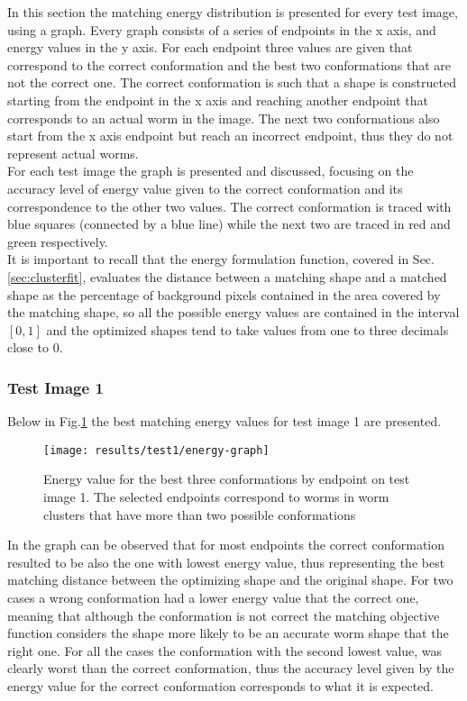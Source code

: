 In this section the matching energy distribution is presented 
for every test image, using a graph. 
Every graph consists of a series of endpoints in the
x axis, and energy values in the y axis. For each endpoint three values 
are given that correspond to the correct conformation and the best two 
conformations that are not the correct one. The correct conformation
is such that a shape is constructed starting from the endpoint in the
x axis and reaching another endpoint that corresponds to an actual
worm in the image. The next two conformations also start from the x axis
endpoint but reach an incorrect endpoint, thus they do not represent 
actual worms.\\
For each test image the graph is presented and discussed, focusing 
on the accuracy level of energy value given to the correct conformation
and its correspondence to the other two values. The correct conformation
is traced with blue squares (connected by a blue line) while the next two
are traced in red and green respectively.\\
It is important to recall that the energy formulation function, covered
in Sec.\ref{sec:clusterfit}, evaluates the distance between a matching shape
and a matched shape as the percentage of background pixels contained in the 
area covered by the matching shape, so all the possible energy values are
contained in the interval $[0,1]$ and the optimized shapes tend to take values
from one to three decimals close to $0$.

\subsubsection*{Test Image 1}

Below in Fig.\ref{fig:energy1} the best matching energy values for 
test image 1 are presented.

\begin{figure}[h]
 \centering
   \texttt{[image: results/test1/energy-graph]}
 \caption{Energy value for the best three conformations by endpoint on test
image 1. The selected endpoints correspond to worms in worm clusters that
have more than two possible conformations}
\label{fig:energy1}
\end{figure}

In the graph can be observed that for most endpoints the correct conformation
resulted to be also the one with lowest energy value, thus representing
the best matching distance between the optimizing shape and the original shape.
For two cases a wrong conformation had a lower energy value that the correct
one, meaning that 
although the conformation is not correct the matching objective function
considers the shape more likely to be an accurate worm shape that the right
one. For all the cases the conformation with the second lowest value, was
clearly worst than the correct conformation, thus the accuracy level given
by the energy value for the correct conformation corresponds to what it is 
expected.\\

